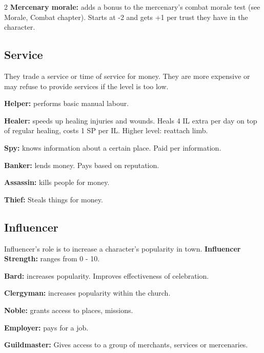 \begin{multicols}{2}
\textbf{Mercenary morale:} adds a bonus to the mercenary's combat morale test (see Morale, Combat chapter). Starts at -2 and gets +1 per trust they have in the character.

\subsection{Service}
They trade a service or time of service for money. They are more expensive or may refuse to provide services if the level is too low. \\

\begin{proplist}
    \item \textbf{Helper:} performs basic manual labour.\\
    \item \textbf{Healer:} speeds up healing injuries and wounds. Heals 4 IL extra per day on top of regular healing, costs 1 SP per IL. Higher level: reattach limb. \\
    \item \textbf{Spy:} knows information about a certain place. Paid per information.\\
    \item \textbf{Banker:} lends money. Pays based on reputation.\\
    \item \textbf{Assassin:} kills people for money.\\
    \item \textbf{Thief:} Steals things for money.\\
\end{proplist}

\subsection{Influencer}
Influencer's role is to increase a character's popularity in town. \textbf{Influencer Strength:} ranges from 0 - 10.   \\

\begin{proplist}
    \item \textbf{Bard:} increases popularity. Improves effectiveness of celebration.\\
    \item \textbf{Clergyman:} increases popularity within the church. \\
    \item \textbf{Noble:} grants access to places, missions. \\
    \item \textbf{Employer:} pays for a job. \\
    \item \textbf{Guildmaster:} Gives access to a group of merchants, services or mercenaries. \\
\end{proplist}



\end{multicols}
